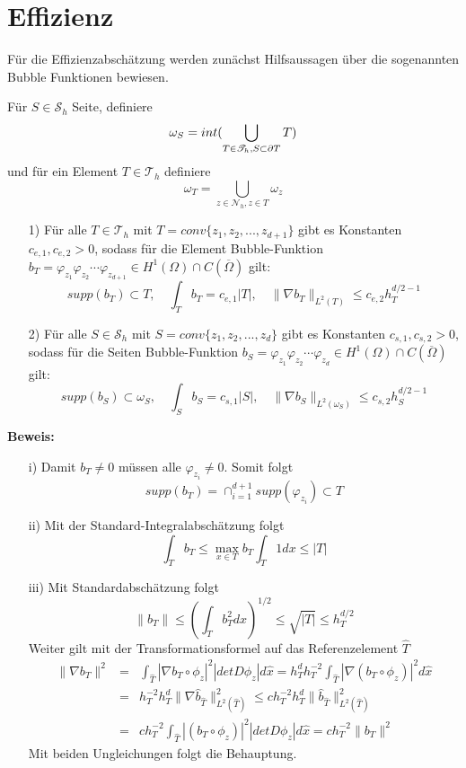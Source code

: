 \section{Effizienz}
Für die Effizienzabschätzung werden zunächst Hilfsaussagen über die sogenannten Bubble Funktionen bewiesen.
\begin{definition}
	Für $S \in \mathscr{S}_h$ Seite, definiere 
	\[
		\omega_S= int(\bigcup_{T\in\mathscr{T}_h,S\subset \partial T}T)
    \]
    und für ein Element $T \in \mathscr{T}_h$ definiere
    \[
    \omega_T = \bigcup_{z\in\mathscr{N}_h,z\in T} \omega_z
    \]
\end{definition}
\begin{lemma}
	\leavevmode
	\begin{itemize}
		\item[1)]
		Für alle $T\in\mathscr{T}_h$ mit $T =conv\{z_1,z_2,...,z_{d+1}\}$ gibt es Konstanten $c_{e,1},c_{e,2}>0$,  sodass für die \textsf{Element Bubble-Funktion} $b_T = \varphi_{z_1}\varphi_{z_2}\cdots\varphi_{z_{d+1}} \in H^1(\Omega)\cap C(\overline{\Omega})$ gilt:
		\[
		supp(b_T)\subset T,\quad \int_{T} b_T =c_{e,1} |T|, \quad \|\nabla b_T\|_{L^2(T)} \leq c_{e,2}h_T^{d/2-1}
		\]
		\item[2)]
		Für alle $S\in\mathscr{S}_h$ mit $S =conv\{z_1,z_2,...,z_{d}\}$ gibt es Konstanten $c_{s,1},c_{s,2}>0$,  sodass für die \textsf{Seiten Bubble-Funktion} $b_S = \varphi_{z_1}\varphi_{z_2}\cdots\varphi_{z_{d}} \in H^1(\Omega)\cap C(\overline{\Omega})$ gilt:
		\[
		supp(b_S)\subset \omega_S,\quad \int_{S} b_S =c_{s,1} |S|, \quad \|\nabla b_S\|_{L^2(\omega_S)} \leq c_{s,2}h_S^{d/2-1}
		\]
	\end{itemize}
\end{lemma}
\textbf{Beweis:}
\begin{itemize}
	\item[i)] Damit $b_T\neq0$ müssen alle $\varphi_{z_{i}}\neq 0$. Somit folgt\[
	supp(b_T) = \cap_{i=1}^{d+1}supp(\varphi_{z_i})\subset T
	\]
	\item[ii)] Mit der Standard-Integralabschätzung folgt \[
	\int_{T}b_T \leq \max_{x\in T}b_T \int_{T}1 dx \leq |T|
	\]
	\item[iii)] Mit Standardabschätzung folgt \[
	\|b_T\| \leq \left(\int_{T}b_T^2dx\right)^{1/2} \leq \sqrt{|T|}\leq h_T^{d/2}
	\] Weiter gilt mit der Transformationsformel auf das Referenzelement $\hat{T}$
	\begin{eqnarray*}
		\|\nabla b_T\|^2 &=& \int_{\hat{T}} |\nabla b_{T}\circ \phi_z|^2 | detD\phi_z|d\hat{x} = h_T^dh^{-2}_T\int_{\hat{T}} |\nabla (b_T\circ \phi_z)|^2 d\hat{x} \\
		&=& h^{-2}_T h_T^d\| \nabla \widehat{b}_{\hat{T}}\|_{L^2(\hat{T})}^2 \leq c h^{-2}_T h_T^d \|\widehat{b}_{\hat{T}}\|_{L^2(\hat{T})}^2 \\
		&=& ch^{-2}_T\int_{\hat{T}} | (b_T\circ \phi_z)|^2 | detD\phi_z| d\hat{x}= ch^{-2}_T \| b_T\|^2
	\end{eqnarray*}
	Mit beiden Ungleichungen folgt die Behauptung.
\end{itemize}
